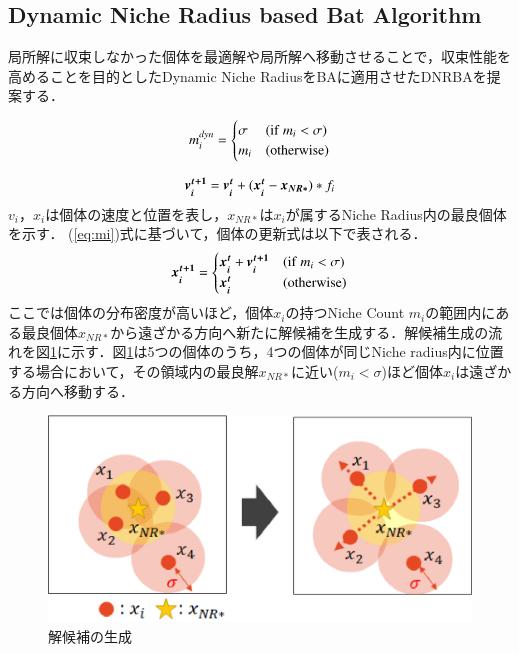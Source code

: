 \documentclass[twocolumn, a4paper]{UECIEresume}
\begin{document}
\subsection{Dynamic Niche Radius based Bat Algorithm}
局所解に収束しなかった個体を最適解や局所解へ移動させることで，収束性能を高めることを目的としたDynamic Niche RadiusをBAに適用させたDNRBAを提案する．

\begin{equation}
\label{eq:mi}
m_i^{dyn}=\begin{cases}
\sigma & ({\rm if } \ m_i < \sigma) \\
m_i & ({\rm otherwise})
\end{cases}
\end{equation}

\begin{equation}
\label{eq:dnrba-vi}
 \mbox{\boldmath $v_i^{t+1}$} = \mbox{\boldmath $v_i^t$} + (\mbox{\boldmath $x_i^t$}-\mbox{\boldmath $x_{NR*}$})*f_i
\end{equation}
$v_i$，$x_i$は個体の速度と位置を表し，$x_{NR*}$は$x_i$が属するNiche Radius内の最良個体を示す．
(\ref{eq:mi})式に基づいて，個体の更新式は以下で表される．
\begin{equation}
\label{eq:dnrba-xi}
\mbox{\boldmath $x_i^{t+1}$}=\begin{cases}
\mbox{\boldmath $x_i^t$}+\mbox{\boldmath $v_i^{t+1}$} & ({\rm if} \ m_i < \sigma) \\
\mbox{\boldmath $x_i^t$} & ({\rm otherwise})
\end{cases}
\end{equation}
ここでは個体の分布密度が高いほど，個体$x_i$の持つNiche Count $m_i$の範囲内にある最良個体$x_{NR*}$から遠ざかる方向へ新たに解候補を生成する．解候補生成の流れを図\ref{fig:nr}に示す．図\ref{fig:nr}は5つの個体のうち，4つの個体が同じNiche radius内に位置する場合において，その領域内の最良解$x_{NR*}$に近い($m_i < \sigma$)ほど個体$x_i$は遠ざかる方向へ移動する．

\begin{figure}[h]
  \centering
  \includegraphics[width=1.0\linewidth]{eps/nr.eps}
  \caption{解候補の生成}
  \label{fig:nr}
\end{figure}
\end{document}
